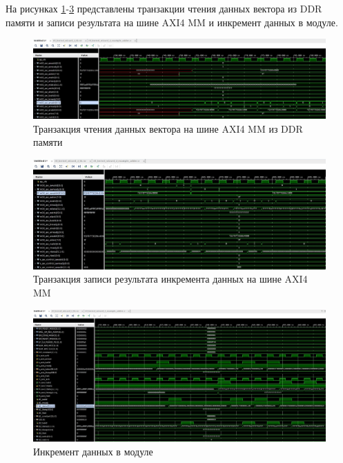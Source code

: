 На рисунках \ref{img:new_read}-\ref{img:new_module_increment} представлены транзакции чтения данных вектора из DDR памяти и записи результата на шине AXI4 MM и инкремент данных в модуле.

\begin{figure}[H]
	\begin{center}
		\includegraphics[scale=0.2]{img/new_read.png}
	\end{center}
	\captionsetup{justification=centering}
	\caption{Транзакция чтения данных вектора на шине AXI4 MM из DDR памяти}
	\label{img:new_read}
\end{figure}

\begin{figure}[H]
	\begin{center}
		\includegraphics[scale=0.3]{img/new_increment.png}
	\end{center}
	\captionsetup{justification=centering}
	\caption{Транзакция записи результата инкремента данных на шине AXI4 MM}
	\label{img:new_increment}
\end{figure}

\begin{figure}[H]
	\begin{center}
		\includegraphics[scale=0.2]{img/new_module_increment.png}
	\end{center}
	\captionsetup{justification=centering}
	\caption{Инкремент данных в модуле}
	\label{img:new_module_increment}
\end{figure}

